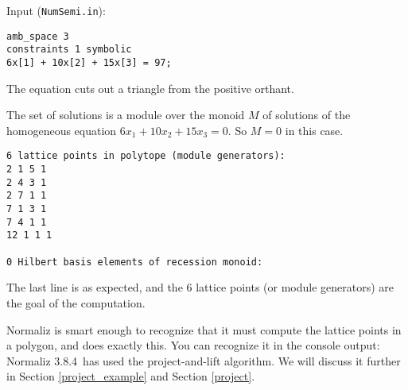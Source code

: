 \documentclass[12pt,a4paper]{scrartcl}
\theoremstyle{definition}
\def\version{3.8.4}
\begin{document}
\begin{minipage}[b]{0.5\textwidth}
Input (\verb|NumSemi.in|):
\begin{Verbatim}
amb_space 3
constraints 1 symbolic
6x[1] + 10x[2] + 15x[3] = 97;
\end{Verbatim}
\end{minipage}
\hspace{1cm}
\begin{minipage}[t]{0.4\textwidth}
\end{minipage}

\medskip
The equation cuts out a triangle from the positive orthant. 

The set of solutions is a module over the monoid $M$ of solutions of the homogeneous equation $6x_1+10x_2+15x_3=0$. So $M=0$ in this case.
\begin{Verbatim}
6 lattice points in polytope (module generators):
2 1 5 1
2 4 3 1
2 7 1 1
7 1 3 1
7 4 1 1
12 1 1 1

0 Hilbert basis elements of recession monoid:
\end{Verbatim}
The last line is as expected, and the $6$ lattice points (or module generators) are the goal of the computation.

Normaliz is smart enough to recognize that it must compute the lattice points in a polygon, and does exactly this. You can recognize it in the console output:  Normaliz \version\ has used the project-and-lift algorithm. We will discuss it further in Section \ref{project_example} and Section \ref{project}.
\end{document}
